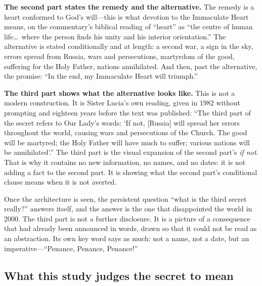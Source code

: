 \textbf{The second part states the remedy and the alternative.} The
remedy is a heart conformed to God's will---this is what devotion to
the Immaculate Heart means, on the commentary's biblical reading of
``heart'' as ``the centre of human life\ldots\ where the person finds
his unity and his interior orientation.'' The alternative is stated
conditionally and at length: a second war, a sign in the sky, errors
spread from Russia, wars and persecutions, martyrdom of the good,
suffering for the Holy Father, nations annihilated. And then, past
the alternative, the promise: ``In the end, my Immaculate Heart will
triumph.''

\textbf{The third part shows what the alternative looks like.} This
is not a modern construction. It is Sister Lucia's own reading, given
in 1982 without prompting and eighteen years before the text was
published: ``The third part of the secret refers to Our Lady's words:
`If not, [Russia] will spread her errors throughout the world,
causing wars and persecutions of the Church. The good will be
martyred; the Holy Father will have much to suffer; various nations
will be annihilated'.'' The third part is the visual expansion of the
second part's \emph{if not}. That is why it contains no new
information, no names, and no dates: it is not adding a fact to the
second part. It is showing what the second part's conditional clause
means when it is not averted.

Once the architecture is seen, the persistent question ``what is the
third secret really?'' answers itself, and the answer is the one that
disappointed the world in 2000. The third part is not a further
disclosure. It is a picture of a consequence that had already been
announced in words, drawn so that it could not be read as an
abstraction. Its own key word says as much: not a name, not a date,
but an imperative---``Penance, Penance, Penance!''

\subsection{What this study judges the secret to mean}

